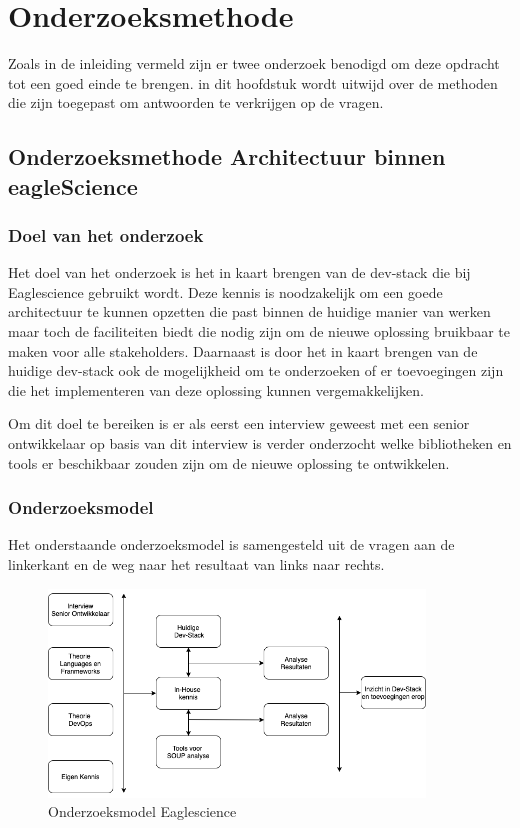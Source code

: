 
\chapter{Onderzoeksmethode} %

\label{OnderzoeksMethode} %
Zoals in de inleiding vermeld zijn er twee onderzoek benodigd om deze opdracht tot een goed einde te brengen. in dit hoofdstuk wordt uitwijd over de methoden die zijn toegepast om antwoorden te verkrijgen op de vragen.

\section{Onderzoeksmethode Architectuur binnen eagleScience}
\subsection{Doel van het onderzoek}
Het doel van het onderzoek is het in kaart brengen van de dev-stack die bij Eaglescience gebruikt wordt. Deze kennis is noodzakelijk om een goede architectuur te kunnen opzetten die past binnen de huidige manier van werken maar toch de faciliteiten biedt die nodig zijn om de nieuwe oplossing bruikbaar te maken voor alle stakeholders. Daarnaast is door het in kaart brengen van de huidige dev-stack ook de mogelijkheid om te onderzoeken of er toevoegingen zijn die het implementeren van deze oplossing kunnen vergemakkelijken.

Om dit doel te bereiken is er als eerst een interview geweest met een senior ontwikkelaar op basis van dit interview is verder onderzocht welke bibliotheken en tools er beschikbaar zouden zijn om de nieuwe oplossing te ontwikkelen.

\subsection{Onderzoeksmodel}
Het onderstaande onderzoeksmodel is samengesteld uit de vragen aan de linkerkant en de weg naar het resultaat van links naar rechts.\\
\begin{figure}[h!]
\myfloatalign
\includegraphics[width=10cm]{gfx/OnderzoeksmodelES}
\caption{Onderzoeksmodel Eaglescience}
\label{fig:Onderzoeks model Dev-Stack}
\end{figure}

